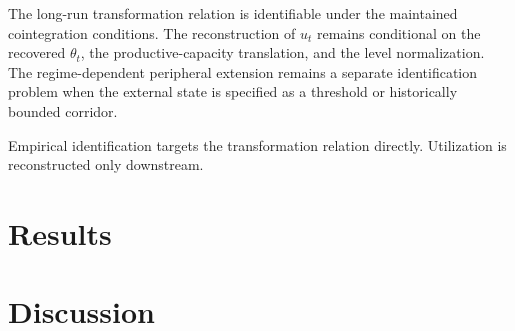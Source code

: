 The long-run transformation relation is identifiable under the maintained cointegration conditions. The reconstruction of $u_t$ remains conditional on the recovered $\theta_t$, the productive-capacity translation, and the level normalization. The regime-dependent peripheral extension remains a separate identification problem when the external state is specified as a threshold or historically bounded corridor.

Empirical identification targets the transformation relation directly. Utilization is reconstructed only downstream.
\section{Results}

\section{Discussion}
